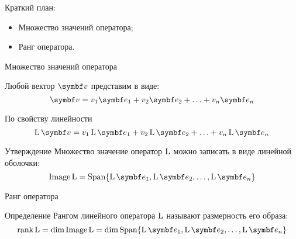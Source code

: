 
\begin{frame} %


\end{frame}



\begin{frame}{Краткий план:}
  \begin{itemize}[<+->]
    \item Множество значений оператора;
    \item Ранг оператора.
  \end{itemize}

\end{frame}


\begin{frame}{Множество значений оператора}

Любой вектор $\bv$ представим в виде:
\[
\bv = v_1 \be_1 + v_2 \be_2 + \ldots + v_n \be_n
\]

\pause
По свойству линейности
\[
\LL \bv = v_1 \LL\be_1 + v_2 \LL\be_2 + \ldots + v_n\LL\be_n
\]

\pause
\begin{block}{Утверждение}
Множество значение оператор $\operatorname{L}$ можно записать в виде линейной оболочки:
\[
\Image \LL  = \Span \{ \LL \be_1, \LL \be_2, \ldots, \LL \be_n  \}  
\]
\end{block}

\end{frame}



\begin{frame}{Ранг оператора}
\begin{block}{Определение}
    \alert{Рангом} линейного оператора $\operatorname{L}$ называют размерность его образа:
    \[
      \rank \LL = \dim \Image \LL = \dim \Span \{ \LL\be_1, \LL\be_2, \ldots, \LL\be_n\}  
    \]
\end{block}
\end{frame}

